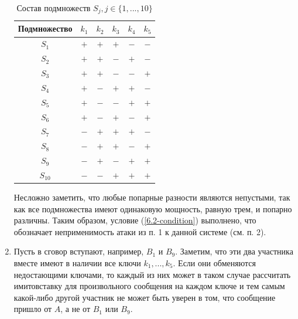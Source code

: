\documentclass[12pt, a4paper]{extarticle}
\begin{document}
\begin{enumerate}
        \begin{table}
            \caption{Состав подмножеств $S_j, j \in \{1, ..., 10\}$}
            \label{key-subsets}
            \centering
            \begin{tabular}{|c|c|c|c|c|c|}
                \hline
                Подмножество & $k_1$ & $k_2$ & $k_3$ & $k_4$ & $k_5$ \\
                \hline
                $S_1$    & $+$ & $+$ & $+$ & $-$ & $-$ \\
                \hline
                $S_2$    & $+$ & $+$ & $-$ & $+$ & $-$ \\
                \hline
                $S_3$    & $+$ & $+$ & $-$ & $-$ & $+$ \\
                \hline
                $S_4$    & $+$ & $-$ & $+$ & $+$ & $-$ \\
                \hline
                $S_5$    & $+$ & $-$ & $-$ & $+$ & $+$ \\
                \hline
                $S_6$    & $+$ & $-$ & $+$ & $-$ & $+$ \\
                \hline
                $S_7$    & $-$ & $+$ & $+$ & $+$ & $-$ \\
                \hline
                $S_8$    & $-$ & $+$ & $+$ & $-$ & $+$ \\
                \hline
                $S_9$    & $-$ & $+$ & $-$ & $+$ & $+$ \\
                \hline
                $S_{10}$ & $-$ & $-$ & $+$ & $+$ & $+$ \\
                \hline
            \end{tabular}
        \end{table}
        
        Несложно заметить, что любые попарные разности являются непустыми, так как все подмножества 
        имеют одинаковую мощность, равную трем, и попарно различны. Таким образом, условие 
        (\ref{6.2-condition}) выполнено, что обозначает неприменимость атаки из п. 1 к данной системе 
        (см. п. 2).
        
    \item Пусть в сговор вступают, например, $B_1$ и $B_9$. Заметим, что эти два участника вместе 
    	имеют в наличии все ключи $k_1, ..., k_5$. Если они обменяются недостающими ключами, то 
    	каждый из них может в таком случае рассчитать имитовставку для произвольного сообщения на 
    	каждом ключе и тем самым какой-либо другой участник не может быть уверен в том, что
        сообщение пришло от $A$, а не от $B_1$ или $B_9$.
\end{enumerate}
\end{document}
